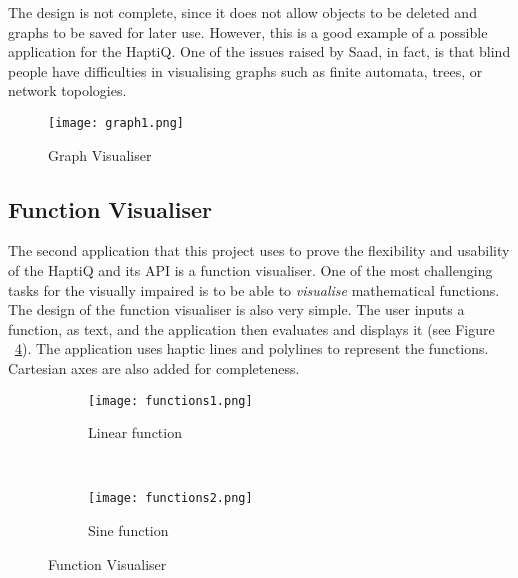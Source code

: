 The design is not complete, since it does not allow objects to be deleted and graphs to be saved for later use. However, this is a good example of a possible application for the HaptiQ. One of the issues raised by Saad, in fact, is that blind people have difficulties in visualising graphs such as finite automata, trees, or network topologies. 

\begin{figure}[H]
  \centering
  \texttt{[image: graph1.png]}
  \caption{Graph Visualiser}
  \label{fig:graphsVis}
\end{figure}

\subsection{Function Visualiser}
\label{sec:funcVis}

The second application that this project uses to prove the flexibility and usability of the HaptiQ and its API is a function visualiser. One of the most challenging tasks for the visually impaired is to be able to \textit{visualise} mathematical functions. The design of the function visualiser is also very simple. The user inputs a function, as text, and the application then evaluates and displays it (see Figure ~\ref{fig:funcVisualiser}). The application uses haptic lines and polylines to represent the functions. Cartesian axes are also added for completeness.

\begin{figure}[H]
        \centering
        \begin{subfigure}[H]{0.4\textwidth}
                \texttt{[image: functions1.png]}
                \caption{Linear function}
                \label{fig:funct1}
        \end{subfigure}%
        ~ %
        \begin{subfigure}[H]{0.4\textwidth}
                \texttt{[image: functions2.png]}
                \caption{Sine function}
                \label{fig:funct2}
        \end{subfigure}
        \caption{Function Visualiser}
        \label{fig:funcVisualiser}
\end{figure}
